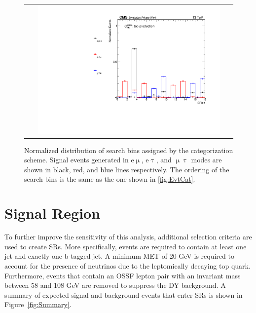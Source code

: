  \begin{figure}[tbh!]
 \begin{center}
 \begin{tabular}{c}
 \includegraphics[width=0.9\textwidth]{figures/Part4/Evt/SRbin}
 \end{tabular}
 \caption{Normalized distribution of search bins assigned by the categorization scheme. Signal events generated in e$\upmu$, e$\uptau$, and $\upmu\uptau$ modes are shown in black, red, and blue lines respectively. The ordering of the search bins is the same as the one shown in \ref{fig:EvtCat}. }
 \label{fig:SRbin}
 \end{center}
 \end{figure}

\section{Signal Region}
\label{sec:SRInclusive}

To further improve the sensitivity of this analysis, additional selection criteria are used to create \acp{SR}. More specifically, events are required to contain at least one jet and exactly one b-tagged jet. A minimum \ac{MET} of 20 GeV is required to account for the presence of neutrinos due to the leptomically decaying top quark. Furthermore, events that contain an \ac{OSSF} lepton pair with an invariant mass between 58 and 108 GeV are removed to suppress the \ac{DY} background. A summary of expected signal and background events that enter \acp{SR} is shown in Figure~\ref{fig:Summary}.


